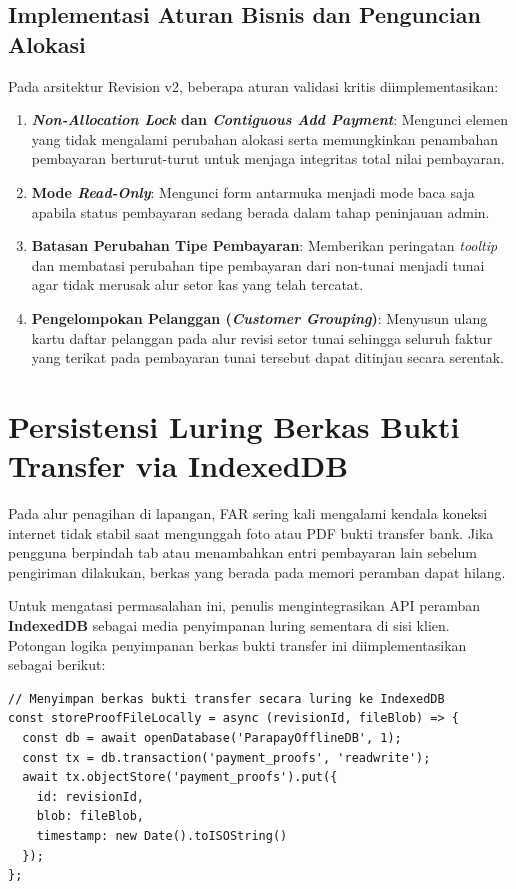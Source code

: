 \subsection{Implementasi Aturan Bisnis dan Penguncian Alokasi}
Pada arsitektur Revision v2, beberapa aturan validasi kritis diimplementasikan:
\begin{enumerate}[label=\alph*)]
  \item \textbf{\textit{Non-Allocation Lock} dan \textit{Contiguous Add Payment}}: Mengunci elemen yang tidak mengalami perubahan alokasi serta memungkinkan penambahan pembayaran berturut-turut untuk menjaga integritas total nilai pembayaran.
  \item \textbf{Mode \textit{Read-Only}}: Mengunci form antarmuka menjadi mode baca saja apabila status pembayaran sedang berada dalam tahap peninjauan admin.
  \item \textbf{Batasan Perubahan Tipe Pembayaran}: Memberikan peringatan \textit{tooltip} dan membatasi perubahan tipe pembayaran dari non-tunai menjadi tunai agar tidak merusak alur setor kas yang telah tercatat.
  \item \textbf{Pengelompokan Pelanggan (\textit{Customer Grouping})}: Menyusun ulang kartu daftar pelanggan pada alur revisi setor tunai sehingga seluruh faktur yang terikat pada pembayaran tunai tersebut dapat ditinjau secara serentak.
\end{enumerate}

\section{Persistensi Luring Berkas Bukti Transfer via IndexedDB}
Pada alur penagihan di lapangan, FAR sering kali mengalami kendala koneksi internet tidak stabil saat mengunggah foto atau PDF bukti transfer bank. Jika pengguna berpindah tab atau menambahkan entri pembayaran lain sebelum pengiriman dilakukan, berkas yang berada pada memori peramban dapat hilang.

Untuk mengatasi permasalahan ini, penulis mengintegrasikan API peramban \textbf{IndexedDB} sebagai media penyimpanan luring sementara di sisi klien. Potongan logika penyimpanan berkas bukti transfer ini diimplementasikan sebagai berikut:

\begin{verbatim}
// Menyimpan berkas bukti transfer secara luring ke IndexedDB
const storeProofFileLocally = async (revisionId, fileBlob) => {
  const db = await openDatabase('ParapayOfflineDB', 1);
  const tx = db.transaction('payment_proofs', 'readwrite');
  await tx.objectStore('payment_proofs').put({
    id: revisionId,
    blob: fileBlob,
    timestamp: new Date().toISOString()
  });
};
\end{verbatim}

